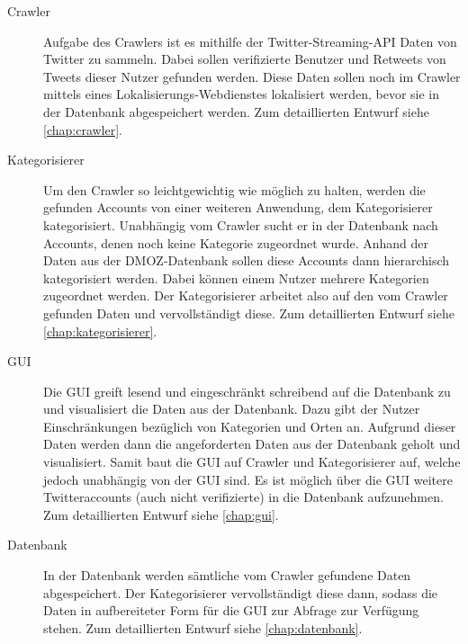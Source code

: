 \begin{description}
	\item[Crawler] Aufgabe des Crawlers ist es mithilfe der Twitter-Streaming-API Daten von Twitter zu sammeln. Dabei sollen verifizierte Benutzer und Retweets von Tweets dieser Nutzer gefunden werden. Diese Daten sollen noch im Crawler mittels eines Lokalisierungs-Webdienstes lokalisiert werden, bevor sie in der Datenbank abgespeichert werden. Zum detaillierten Entwurf siehe \cref{chap:crawler}.
	\item[Kategorisierer] Um den Crawler so leichtgewichtig wie möglich zu halten, werden die gefunden Accounts von einer weiteren Anwendung, dem Kategorisierer kategorisiert. Unabhängig vom Crawler sucht er in der Datenbank nach Accounts, denen noch keine Kategorie zugeordnet wurde. Anhand der Daten aus der DMOZ-Datenbank sollen diese Accounts dann hierarchisch kategorisiert werden. Dabei können einem Nutzer mehrere Kategorien zugeordnet werden. Der Kategorisierer arbeitet also auf den vom Crawler gefunden Daten und vervollständigt diese. Zum detaillierten Entwurf siehe \cref{chap:kategorisierer}.
	\item[GUI] Die GUI greift lesend und eingeschränkt schreibend auf die Datenbank zu und visualisiert die Daten aus der Datenbank. Dazu gibt der Nutzer Einschränkungen bezüglich von Kategorien und Orten an. Aufgrund dieser Daten werden dann die angeforderten Daten aus der Datenbank geholt und visualisiert. Samit baut die GUI auf Crawler und Kategorisierer auf, welche jedoch unabhängig von der GUI sind. Es ist möglich über die GUI weitere Twitteraccounts (auch nicht verifizierte) in die Datenbank aufzunehmen. Zum detaillierten Entwurf siehe \cref{chap:gui}.
	\item[Datenbank] In der Datenbank werden sämtliche vom Crawler gefundene Daten abgespeichert. Der Kategorisierer vervollständigt diese dann, sodass die Daten in aufbereiteter Form für die GUI zur Abfrage zur Verfügung stehen. Zum detaillierten Entwurf siehe \cref{chap:datenbank}.
\end{description}